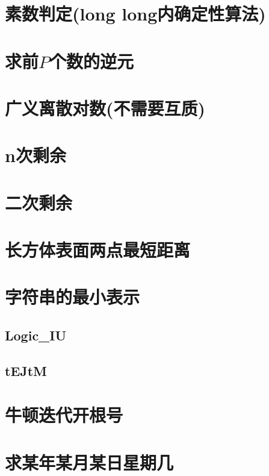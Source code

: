 \documentclass[a4paper,10pt]{book}
\begin{document}
	\section{素数判定(long long内确定性算法)}
		
	
	\section{求前$P$个数的逆元}
		
	
	\section{广义离散对数(不需要互质)}
		
	
	\section{n次剩余}
		
	
	\section{二次剩余}
		
    
    \section{长方体表面两点最短距离}
        

	\section{字符串的最小表示}
		\subsection{Logic\_IU}
			
		\subsection{tEJtM}
			
    
    \section{牛顿迭代开根号}
        

    \section{求某年某月某日星期几}
        
	
\end{document}
